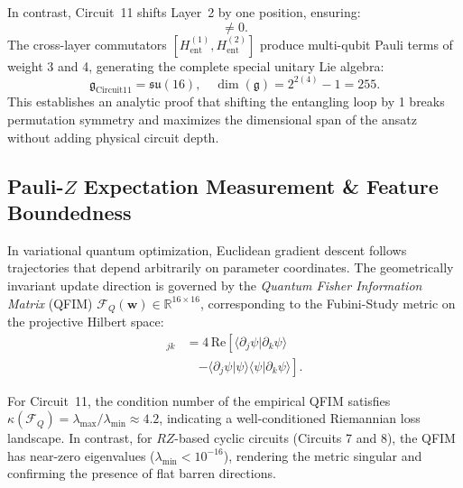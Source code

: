 \documentclass[journal]{IEEEtran}
\begin{document}
In contrast, Circuit~11 shifts Layer~2 by one position, ensuring:
\begin{equation}
[\hat{T}, H_{\mathrm{ent}}^{(2)}] \neq 0.
\label{eq:translation_breaking}
\end{equation}
The cross-layer commutators $[H_{\mathrm{ent}}^{(1)}, H_{\mathrm{ent}}^{(2)}]$ produce multi-qubit Pauli terms of weight 3 and 4, generating the complete special unitary Lie algebra:
\begin{equation}
\mathfrak{g}_{\mathrm{Circuit11}} = \mathfrak{su}(16), \quad \dim(\mathfrak{g}) = 2^{2(4)} - 1 = 255.
\label{eq:full_algebra}
\end{equation}
This establishes an analytic proof that shifting the entangling loop by 1 breaks permutation symmetry and maximizes the dimensional span of the ansatz without adding physical circuit depth.

\subsection{Pauli-$Z$ Expectation Measurement \& Feature Boundedness}
In variational quantum optimization, Euclidean gradient descent follows trajectories that depend arbitrarily on parameter coordinates. The geometrically invariant update direction is governed by the \textit{Quantum Fisher Information Matrix} (QFIM) $\mathcal{F}_Q(\mathbf{w}) \in \mathbb{R}^{16 \times 16}$, corresponding to the Fubini-Study metric on the projective Hilbert space:
\begin{align}
[\mathcal{F}_Q]_{jk} &= 4 \, \mathrm{Re}\left[ \langle \partial_j \psi | \partial_k \psi \rangle \right. \nonumber \\
&\quad \left. - \langle \partial_j \psi | \psi \rangle \langle \psi | \partial_k \psi \rangle \right].
\label{eq:qfim_definition}
\end{align}

For Circuit~11, the condition number of the empirical QFIM satisfies $\kappa(\mathcal{F}_Q) = \lambda_{\max}/\lambda_{\min} \approx 4.2$, indicating a well-conditioned Riemannian loss landscape. In contrast, for $RZ$-based cyclic circuits (Circuits 7 and 8), the QFIM has near-zero eigenvalues ($\lambda_{\min} < 10^{-16}$), rendering the metric singular and confirming the presence of flat barren directions.
\end{document}
